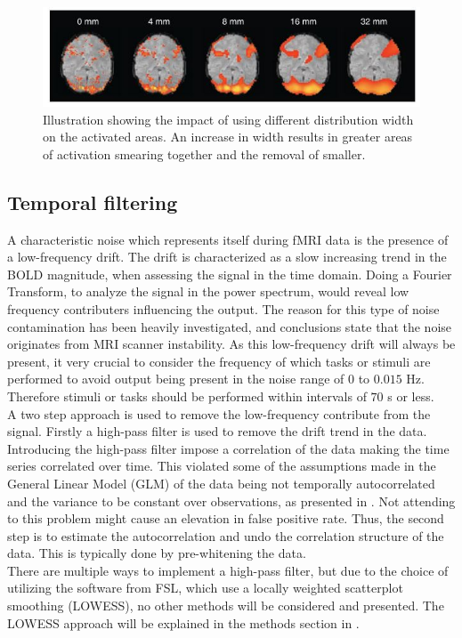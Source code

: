 \begin{figure}[H]                 
	\includegraphics[width=.8\textwidth]{figures/aBackground/smooth}  
	\caption{Illustration showing the impact of using different distribution width on the activated areas. An increase in width results in greater areas of activation smearing together and the removal of smaller. \cite{Poldrack2011}}
	\label{fig:back:smooth} 
\end{figure}  

\subsection{Temporal filtering}

A characteristic noise which represents itself during fMRI data is the presence of a low-frequency drift. The drift is characterized as a slow increasing trend in the BOLD magnitude, when assessing the signal in the time domain. Doing a Fourier Transform, to analyze the signal in the power spectrum, would reveal low frequency contributers influencing the output. The reason for this type of noise contamination has been heavily investigated, and conclusions state that the noise originates from MRI scanner instability. As this low-frequency drift will always be present, it very crucial to consider the frequency of which tasks or stimuli are performed to avoid output being present in the noise range of $0$ to $0.015$ Hz. Therefore stimuli or tasks should be performed within intervals of $70$ s or less. \cite{Poldrack2011} \\
A two step approach is used to remove the low-frequency contribute from the signal. Firstly a high-pass filter is used to remove the drift trend in the data. Introducing the high-pass filter impose a correlation of the data making the time series correlated over time. This violated some of the assumptions made in the General Linear Model (GLM) of the data being not temporally autocorrelated and the variance to be constant over observations, as presented in . Not attending to this problem might cause an elevation in false positive rate. Thus, the second step is to estimate the autocorrelation and undo the correlation structure of the data. This is typically done by pre-whitening the data. \\
There are multiple ways to implement a high-pass filter, but due to the choice of utilizing the software from FSL, which use a locally weighted scatterplot smoothing (LOWESS), no other methods will be considered and presented. \cite{Poldrack2011} The LOWESS approach will be explained in the methods section in .
